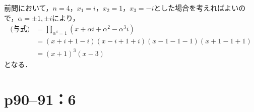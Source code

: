 \documentclass[a4paper,10pt,fleqn]{ltjsarticle}
\begin{document}
\begin{leftbar}
  前問において，$n=4$，$x_1 = i$，$x_2 = 1$，$x_3=-i$とした場合を考えればよいので，$\alpha = \pm 1 , \pm i$により，
  \begin{align*}
    \text{(与式)} & = \prod_{\alpha^4=1} (x+ \alpha i +\alpha^2 -  \alpha^3i ) \\
                & = (x+i+1-i) (x-i+1+i)(x-1-1-1)(x+1-1+1)                    \\
                & =(x+1)^3(x-3)
  \end{align*}
  となる．
\end{leftbar}

\newpage

\section*{p90--91：6}
\end{document}
